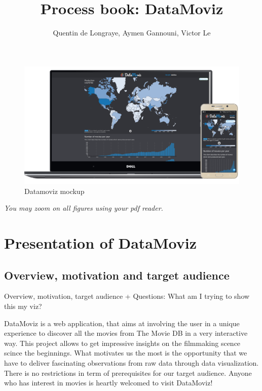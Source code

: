 \documentclass[a4paper,10pt]{article}
\begin{document}
\title{Process book: DataMoviz}
\author{Quentin de Longraye, Aymen Gannouni, Victor Le}

\maketitle

\begin{figure}[ht]
   \centering
   \includegraphics[width=0.8\linewidth]{../docs/mockup.png}
  \caption{Datamoviz mockup}
\end{figure}

\setlength{\parskip}{0.1\baselineskip}

\tableofcontents

\setlength{\parskip}{0.4\baselineskip}

\newpage

\textit{You may zoom on all figures using your pdf reader.}

\section{Presentation of DataMoviz}

\subsection{Overview, motivation and target audience}
Overview, motivation, target audience
+ Questions: What am I trying to show this my viz?

DataMoviz is a web application, that aims at involving the user in a unique experience to discover all the movies from The Movie DB in a very interactive way. This project allows to get impressive insights on the filmmaking scence scince the beginnings.
What motivates us the most is the opportunity that we have to deliver fascinating observations from raw data through data visualization.
There is no restrictions in term of prerequisites for our target audience. Anyone who has interest in movies is heartly welcomed to visit DataMoviz!
\end{document}
